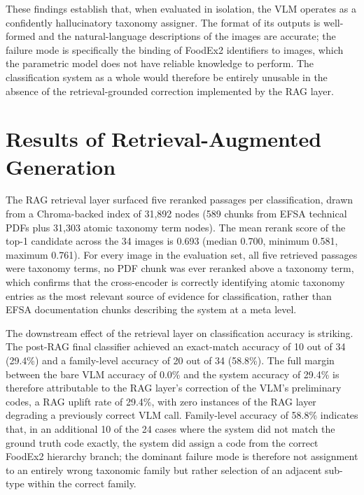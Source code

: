 These findings establish that, when evaluated in isolation, the VLM operates as a confidently hallucinatory taxonomy assigner. The format of its outputs is well-formed and the natural-language descriptions of the images are accurate; the failure mode is specifically the binding of FoodEx2 identifiers to images, which the parametric model does not have reliable knowledge to perform. The classification system as a whole would therefore be entirely unusable in the absence of the retrieval-grounded correction implemented by the RAG layer.

\hypertarget{results-of-retrieval-augmented-generation}{%
\section{Results of Retrieval-Augmented Generation}\label{results-of-retrieval-augmented-generation}}

The RAG retrieval layer surfaced five reranked passages per classification, drawn from a Chroma-backed index of 31,892 nodes (589 chunks from EFSA technical PDFs plus 31,303 atomic taxonomy term nodes). The mean rerank score of the top-1 candidate across the 34 images is 0.693 (median 0.700, minimum 0.581, maximum 0.761). For every image in the evaluation set, all five retrieved passages were taxonomy terms, no PDF chunk was ever reranked above a taxonomy term, which confirms that the cross-encoder is correctly identifying atomic taxonomy entries as the most relevant source of evidence for classification, rather than EFSA documentation chunks describing the system at a meta level.

The downstream effect of the retrieval layer on classification accuracy is striking. The post-RAG final classifier achieved an exact-match accuracy of 10 out of 34 (29.4\%) and a family-level accuracy of 20 out of 34 (58.8\%). The full margin between the bare VLM accuracy of 0.0\% and the system accuracy of 29.4\% is therefore attributable to the RAG layer's correction of the VLM's preliminary codes, a RAG uplift rate of 29.4\%, with zero instances of the RAG layer degrading a previously correct VLM call. Family-level accuracy of 58.8\% indicates that, in an additional 10 of the 24 cases where the system did not match the ground truth code exactly, the system did assign a code from the correct FoodEx2 hierarchy branch; the dominant failure mode is therefore not assignment to an entirely wrong taxonomic family but rather selection of an adjacent sub-type within the correct family.


